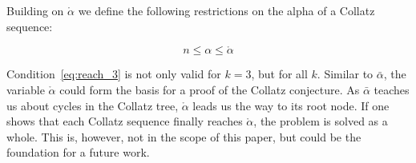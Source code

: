 Building on $\mathring\alpha$ we define the following restrictions on the alpha of a Collatz sequence:

\begin{equation}
\label{eq:reach_3}
n\le\alpha\le\mathring\alpha
\end{equation}

Condition~\ref{eq:reach_3} is not only valid for $k=3$, but for all $k$. Similar to $\bar\alpha$, the variable $\mathring\alpha$ could form the basis for a proof of the Collatz conjecture. As $\bar\alpha$ teaches us about cycles in the Collatz tree, $\mathring\alpha$ leads us the way to its root node. If one shows that each Collatz sequence finally reaches $\mathring\alpha$, the problem is solved as a whole. This is, however, not in the scope of this paper, but could be the foundation for a future work.
